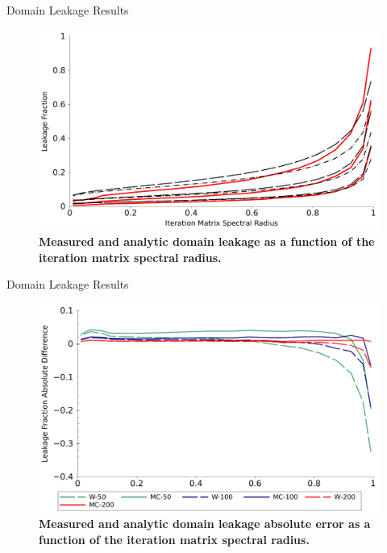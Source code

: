 \documentclass{beamer}
\begin{document}
\begin{frame}{Domain Leakage Results}

  \begin{figure}[t!]
    \begin{center}
      \includegraphics[width=4.5in,clip]{leakage_variation_2.pdf}
    \end{center}
    \caption{\textbf{Measured and analytic domain leakage as a
        function of the iteration matrix spectral radius.}}
  \end{figure}

\end{frame}

\begin{frame}{Domain Leakage Results}

  \begin{figure}[ht!]
      \begin{center}
        \includegraphics[width=4.5in,clip]{leakage_error_2.pdf}
      \end{center}
      \caption{\textbf{Measured and analytic domain leakage absolute
          error as a function of the iteration matrix spectral radius.}}
  \end{figure}

\end{frame}
\end{document}
